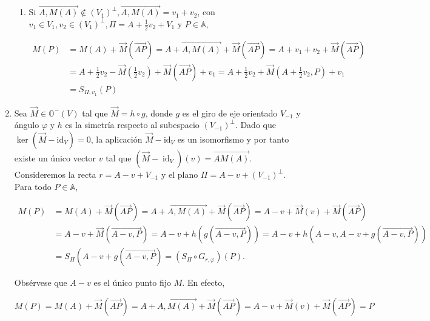 \documentclass[12pt, a4paper, ones, notitlepage, openany,titlepage]{article}
\begin{document}
\begin{enumerate}[label=(\arabic*)]
\begin{enumerate}[label=(\alph*)]
	\item Si $\overrightarrow{A, M(A)} \notin\left(V_{1}\right)^{\perp}, \overrightarrow{A, M(A)}=v_{1}+v_{2}$, con $v_{1} \in V_{1}, v_{2} \in\left(V_{1}\right)^{\perp}, \Pi=A+\frac{1}{2} v_{2}+V_{1}$ y $P \in \mathbb{A}$,
	
	$$
	\begin{aligned}
		M(P) & =M(A)+\overrightarrow{M}(\overrightarrow{A P})=A+\overrightarrow{A, M(A)}+\overrightarrow{M}(\overrightarrow{A P})=A+v_{1}+v_{2}+\overrightarrow{M}(\overrightarrow{A P}) \\
		& =A+\frac{1}{2} v_{2}-\overrightarrow{M}\left(\frac{1}{2} v_{2}\right)+\overrightarrow{M}(\overrightarrow{A P})+v_{1}=A+\frac{1}{2} v_{2}+\overrightarrow{M}\left(A+\frac{1}{2} v_{2}, P\right)+v_{1} \\
		& =S_{\Pi, v_{1}}(P)
	\end{aligned}
	$$
\end{enumerate}

\item Sea $\overrightarrow{M} \in \mathbb{O}^{-}(V)$ tal que $\overrightarrow{M}=h \circ g$, donde $g$ es el giro de eje orientado $V_{-1}$ y ángulo $\varphi$ y $h$ es la simetría respecto al subespacio $\left(V_{-1}\right)^{\perp}$. Dado que $\ker\left(\overrightarrow{M}-\mathrm{id}_{V}\right)=0$, la aplicación $\overrightarrow{M}-\mathrm{id}_{V}$ es un isomorfismo y por tanto existe un único vector $v$ tal que $\left(\overrightarrow{M}-\operatorname{id}_{V}\right)(v)=\overrightarrow{A M(A)}$. Consideremos la recta $r=A-v+V_{-1}$ y el plano $\Pi=A-v+\left(V_{-1}\right)^{\perp}$. Para todo $P \in \mathbb{A}$,

$$
\begin{aligned}
	M(P) & =M(A)+\overrightarrow{M}(\overrightarrow{A P})=A+\overrightarrow{A, M(A)}+\overrightarrow{M}(\overrightarrow{A P})=A-v+\overrightarrow{M}(v)+\overrightarrow{M}(\overrightarrow{A P}) \\
	& =A-v+\overrightarrow{M}(\overrightarrow{A-v, P})=A-v+h(g(\overrightarrow{A-v, P}))=A-v+h(A-v, A-v+g(\overrightarrow{A-v, P})) \\
	& =S_{\Pi}\left(A-v+g(\overrightarrow{A-v, P})=\left(S_{\Pi} \circ G_{r, \varphi}\right)(P) .\right.
\end{aligned}
$$

Obsérvese que $A-v$ es el único punto fijo $M$. En efecto,

$$
M(P)=M(A)+\overrightarrow{M}(\overrightarrow{A P})=A+\overrightarrow{A, M(A)}+\overrightarrow{M}(\overrightarrow{A P})=A-v+\overrightarrow{M}(v)+\overrightarrow{M}(\overrightarrow{A P})=P
$$


\end{enumerate}
\end{document}
